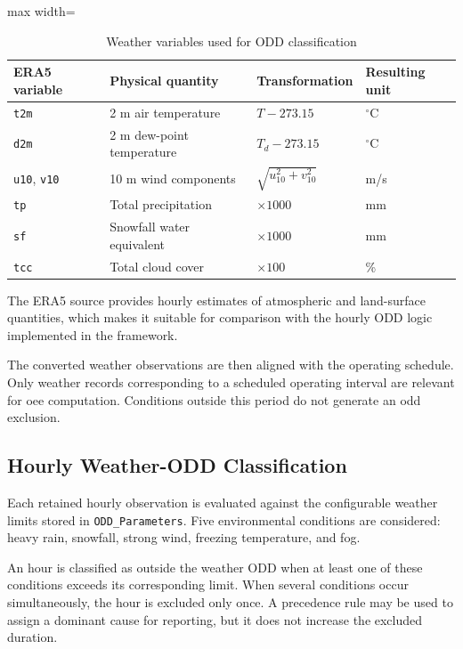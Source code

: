 \begin{table}[htbp]
\small
\renewcommand{\arraystretch}{1.3}
\centering
\caption{Weather variables used for ODD classification}
\label{tab:weather-variables-odd-classification}
\begin{adjustbox}{max width=\textwidth}
\begin{tabular}{|p{2.0cm}|p{4.0cm}|p{5.0cm}|p{2.0cm}|}
\hline
\textbf{ERA5 variable} & \textbf{Physical quantity} & \textbf{Transformation} & \textbf{Resulting unit} \\
\hline
\texttt{t2m} & 2 m air temperature & $T - 273.15$ & $^\circ$C \\
\hline
\texttt{d2m} & 2 m dew-point temperature & $T_d - 273.15$ & $^\circ$C \\
\hline
\texttt{u10}, \texttt{v10} & 10 m wind components & $\sqrt{u_{10}^{2} + v_{10}^{2}}$ & m/s \\
\hline
\texttt{tp} & Total precipitation & $\times 1000$ & mm \\
\hline
\texttt{sf} & Snowfall water equivalent & $\times 1000$ & mm \\
\hline
\texttt{tcc} & Total cloud cover & $\times 100$ & \% \\
\hline
\end{tabular}
\end{adjustbox}
\end{table}

The ERA5 source provides hourly estimates of atmospheric and land-surface quantities, which makes it suitable for comparison with the hourly ODD logic implemented in the framework.

The converted weather observations are then aligned with the operating schedule. Only weather records corresponding to a scheduled operating interval are relevant for \gls{oee} computation. Conditions outside this period do not generate an \gls{odd} exclusion.

\subsection{Hourly Weather-ODD Classification}
\label{subsec:hourly-weather-odd-classification}
Each retained hourly observation is evaluated against the configurable weather limits stored in \texttt{ODD\_Parameters}. Five environmental conditions are considered: heavy rain, snowfall, strong wind, freezing temperature, and fog.

An hour is classified as outside the weather ODD when at least one of these conditions exceeds its corresponding limit. When several conditions occur simultaneously, the hour is excluded only once. A precedence rule may be used to assign a dominant cause for reporting, but it does not increase the excluded duration.

